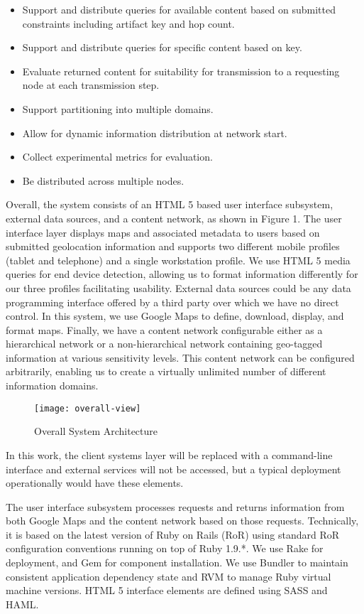\begin{itemize}
\item Support and distribute queries for available content based on submitted constraints including artifact key and hop count.
\item Support and distribute queries for specific content based on key.
\item Evaluate returned content for suitability for transmission to a requesting node at each transmission step.
\item Support partitioning into multiple domains.
\item Allow for dynamic information distribution at network start.
\item Collect experimental metrics for evaluation.
\item Be distributed across multiple nodes.
\end{itemize}

Overall, the system consists of an HTML 5 based user interface subsystem, external data sources, and a content network, as shown in Figure 1.  The user interface layer displays maps and associated metadata to users based on submitted geolocation information and supports two different mobile profiles (tablet and telephone) and a single workstation profile.  We use HTML 5 media queries for end device detection, allowing us to format information differently for our three profiles facilitating usability.  External data sources could be any data programming interface offered by a third party over which we have no direct control.  In this system, we use Google Maps to define, download, display, and format maps.  Finally, we have a content network configurable either as a hierarchical network or a non-hierarchical network containing geo-tagged information at various sensitivity levels.  This content network can be configured arbitrarily, enabling us to create a virtually unlimited number of different information domains.

\begin{figure}[!t]
\centering
\texttt{[image: overall-view]}
\caption{Overall System Architecture}
\label{fig:model:overall-view}
\end{figure}

In this work, the client systems layer will be replaced with a command-line interface and external services will not be accessed, but a typical deployment operationally would have these elements.

The user interface subsystem processes requests and returns information from both Google Maps and the content network based on those requests.  Technically, it is based on the latest version of Ruby on Rails (RoR) using standard RoR configuration conventions running on top of Ruby 1.9.*.  We use Rake for deployment, and Gem for component installation.  We use Bundler to maintain consistent application dependency state and RVM to manage Ruby virtual machine versions.  HTML 5 interface elements are defined using SASS and HAML.

